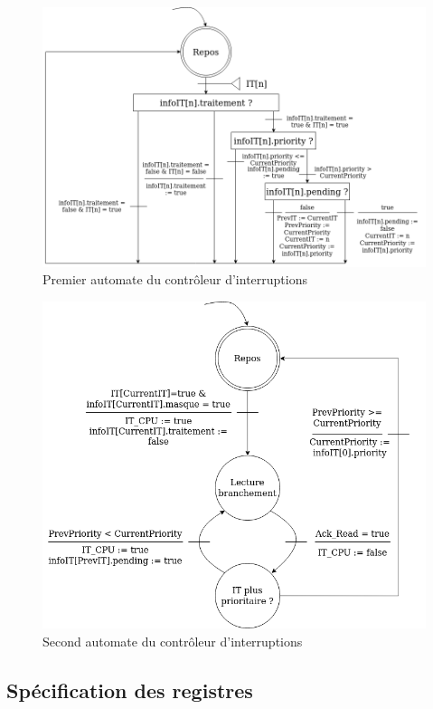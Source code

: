 \begin{figure}[H]
	\centering
	\includegraphics[width=0.9\linewidth]{figure/spec_fonc_1.png}
	\caption{Premier automate du contrôleur d'interruptions}
	\label{fig:spec_func_1}
\end{figure} 

\begin{figure}[H]
	\centering
	\includegraphics[width=0.9\linewidth]{figure/spec_fonc_2.png}
	\caption{Second automate du contrôleur d'interruptions}
	\label{fig:spec_func_2}
\end{figure} 

\subsection{Spécification des registres}

